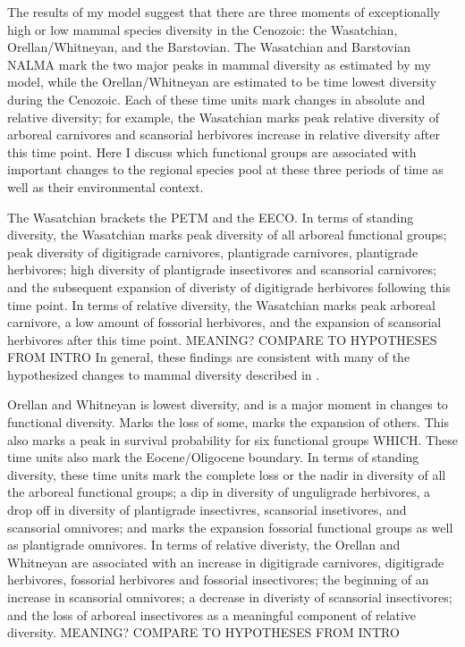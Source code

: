 \documentclass[12pt,letterpaper]{article}
\begin{document}
The results of my model suggest that there are three moments of exceptionally high or low mammal species diversity in the Cenozoic: the Wasatchian, Orellan/Whitneyan, and the Barstovian. The Wasatchian and Barstovian NALMA mark the two major peaks in mammal diversity as estimated by my model, while the Orellan/Whitneyan are estimated to be time lowest diversity during the Cenozoic. Each of these time units mark changes in absolute and relative diversity; for example, the Wasatchian marks peak relative diversity of arboreal carnivores and scansorial herbivores increase in relative diversity after this time point. Here I discuss which functional groups are associated with important changes to the regional species pool at these three periods of time as well as their environmental context.


The Wasatchian brackets the PETM and the EECO. In terms of standing diversity, the Wasatchian marks peak diversity of all arboreal functional groups; peak diversity of digitigrade carnivores, plantigrade carnivores, plantigrade herbivores; high diversity of plantigrade insectivores and scansorial carnivores; and the subsequent expansion of diveristy of digitigrade herbivores following this time point. In terms of relative diversity, the Wasatchian marks peak arboreal carnivore, a low amount of fossorial herbivores, and the expansion of scansorial herbivores after this time point. \uppercase{meaning? compare to hypotheses from intro}
In general, these findings are consistent with many of the hypothesized changes to mammal diversity described in \citet{Woodburne2009}.



Orellan and Whitneyan is lowest diversity, and is a major moment in changes to functional diversity. Marks the loss of some, marks the expansion of others. This also marks a peak in survival probability for six functional groups WHICH. These time units also mark the Eocene/Oligocene boundary. In terms of standing diversity, these time units mark the complete loss or the nadir in diversity of all the arboreal functional groups; a dip in diversity of unguligrade herbivores, a drop off in diversity of plantigrade insectivres, scansorial insetivores, and scansorial omnivores; and marks the expansion fossorial functional groups as well as plantigrade omnivores. In terms of relative diveristy, the Orellan and Whitneyan are associated with an increase in digitigrade carnivores, digitigrade herbivores, fossorial herbivores and fossorial insectivores; the beginning of an increase in scansorial omnivores; a decrease in diveristy of scansorial insectivores; and the loss of arboreal insectivores as a meaningful component of relative diversity. \uppercase{meaning? compare to hypotheses from intro}
\end{document}
